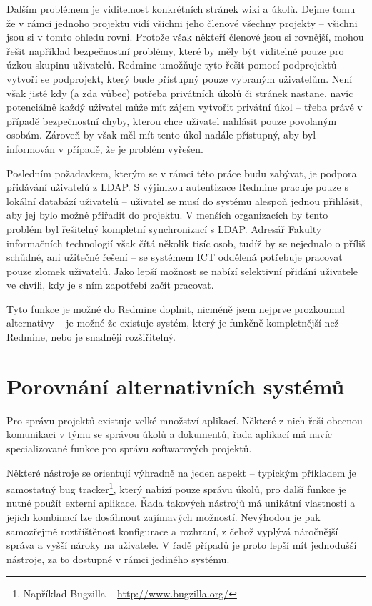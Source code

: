 \documentclass[thesis=B,czech]{FITthesis}[2012/05/02]
\begin{document}
Dalším problémem je viditelnost konkrétních stránek wiki a úkolů. Dejme
tomu že v rámci jednoho projektu vidí všichni jeho členové všechny
projekty -- všichni jsou si v tomto ohledu rovni. Protože však někteří
členové jsou si rovnější, mohou řešit například bezpečnostní problémy,
které by měly být viditelné pouze pro úzkou skupinu uživatelů. Redmine
umožňuje tyto  řešit pomocí podprojektů --
vytvoří se podprojekt, který bude přístupný pouze vybraným uživatelům.
Není však jisté kdy (a zda vůbec) potřeba privátních úkolů či stránek
nastane, navíc potenciálně každý uživatel může mít zájem vytvořit
privátní úkol -- třeba právě v případě bezpečnostní chyby, kterou chce
uživatel nahlásit pouze povolaným osobám. Zároveň by však měl mít tento
úkol nadále přístupný, aby byl informován v případě, že je problém
vyřešen.

Posledním požadavkem, kterým se v rámci této práce budu zabývat, je
podpora přidávání uživatelů z \gls{LDAP}. S výjimkou autentizace Redmine
pracuje pouze s lokální databází uživatelů -- uživatel se musí do
systému alespoň jednou přihlásit, aby jej bylo možné přiřadit do
projektu. V menších organizacích by tento problém byl řešitelný
kompletní synchronizací s \gls{LDAP}. Adresář Fakulty informačních
technologií však čítá několik tisíc osob, tudíž by se nejednalo o příliš
schůdné, ani užitečné řešení -- se systémem ICT oddělená potřebuje
pracovat pouze zlomek uživatelů. Jako lepší možnost se nabízí selektivní
přidání uživatele ve chvíli, kdy je s ním zapotřebí začít pracovat.

Tyto funkce je možné do Redmine doplnit, nicméně jsem nejprve prozkoumal
alternativy -- je možné že existuje systém, který je funkčně
kompletnější než Redmine, nebo je snadněji rozšiřitelný.

\chapter{Porovnání alternativních systémů}

Pro správu projektů existuje velké množství aplikací. Některé z nich
řeší obecnou komunikaci v týmu se správou úkolů a dokumentů, řada
aplikací má navíc specializované funkce pro správu softwarových
projektů.

Některé nástroje se orientují výhradně na jeden aspekt -- typickým
příkladem je samostatný \gls{bug tracker}\footnote{Například Bugzilla --
  \url{http://www.bugzilla.org/}}, který nabízí pouze správu úkolů, pro
další funkce je nutné použít externí aplikace. Řada takových nástrojů má
unikátní vlastnosti a jejich kombinací lze dosáhnout zajímavých
možností. Nevýhodou je pak samozřejmě roztříštěnost konfigurace a
rozhraní, z čehož vyplývá náročnější správa a vyšší nároky na uživatele.
V řadě případů je proto lepší mít jednodušší nástroje, za to dostupné v
rámci jediného systému.
\end{document}
